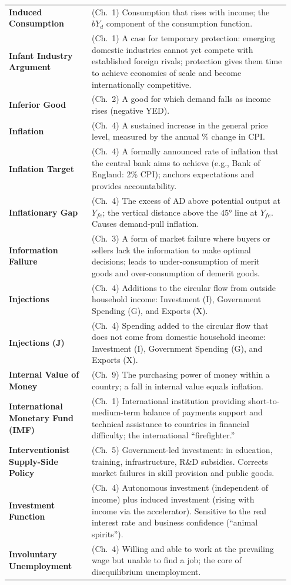 \documentclass[11pt, a4paper, twoside]{book}
\begin{document}
\begin{longtable}{@{}>{\RaggedRight\arraybackslash}p{0.28\linewidth}>{\RaggedRight\arraybackslash}p{0.67\linewidth}@{}}
\textbf{Induced Consumption} & (Ch.~1) Consumption that rises with income; the $bY_d$ component of the consumption function. \\
\textbf{Infant Industry Argument} & (Ch.~1) A case for temporary protection: emerging domestic industries cannot yet compete with established foreign rivals; protection gives them time to achieve economies of scale and become internationally competitive. \\
\textbf{Inferior Good} & (Ch.~2) A good for which demand falls as income rises (negative YED). \\
\textbf{Inflation} & (Ch.~4) A sustained increase in the general price level, measured by the annual \% change in CPI. \\
\textbf{Inflation Target} & (Ch.~4) A formally announced rate of inflation that the central bank aims to achieve (e.g., Bank of England: 2\% CPI); anchors expectations and provides accountability. \\
\textbf{Inflationary Gap} & (Ch.~4) The excess of AD above potential output at $Y_{fe}$; the vertical distance above the 45° line at $Y_{fe}$. Causes demand-pull inflation. \\
\textbf{Information Failure} & (Ch.~3) A form of market failure where buyers or sellers lack the information to make optimal decisions; leads to under-consumption of merit goods and over-consumption of demerit goods. \\
\textbf{Injections} & (Ch.~4) Additions to the circular flow from outside household income: Investment (I), Government Spending (G), and Exports (X). \\
\textbf{Injections (J)} & (Ch.~4) Spending added to the circular flow that does not come from domestic household income: Investment (I), Government Spending (G), and Exports (X). \\
\textbf{Internal Value of Money} & (Ch.~9) The purchasing power of money within a country; a fall in internal value equals inflation. \\
\textbf{International Monetary Fund (IMF)} & (Ch.~1) International institution providing short-to-medium-term balance of payments support and technical assistance to countries in financial difficulty; the international ``firefighter.'' \\
\textbf{Interventionist Supply-Side Policy} & (Ch.~5) Government-led investment: in education, training, infrastructure, R\&D subsidies. Corrects market failures in skill provision and public goods. \\
\textbf{Investment Function} & (Ch.~4) Autonomous investment (independent of income) plus induced investment (rising with income via the accelerator). Sensitive to the real interest rate and business confidence (``animal spirits''). \\
\textbf{Involuntary Unemployment} & (Ch.~4) Willing and able to work at the prevailing wage but unable to find a job; the core of disequilibrium unemployment. \\


\end{longtable}
\end{document}
